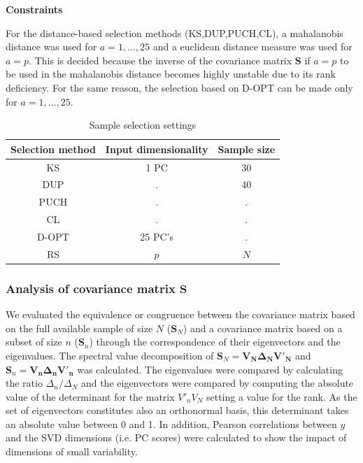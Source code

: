 \documentclass[journal=ancham,manuscript=article]{achemso}
\begin{document}
\textbf{Constraints}

For the distance-based selection methods (KS,DUP,PUCH,CL), a mahalanobis distance was used for $a=1,...,25$ and a euclidean distance measure was used for $a=p$. This is decided because the inverse of the covariance matrix $\mathbf{S}$ if $a=p$ to be used in the mahalanobis distance becomes highly unstable due to its rank deficiency. For the same reason, the selection based on D-OPT can be made only for $a=1,...,25$. 

\begin{table}[t]
\centering
\begin{tabular}{|c|c|c|} 
\hline
Selection method	& Input dimensionality	& Sample size	\\
\hline

KS & 1 PC   & 30  \\
DUP &  . & 40\\
PUCH &  . & . \\
CL & . & . \\
D-OPT & 25 PC's & .\\
RS & $p$ & $N$\\
\hline


\end{tabular}
\caption{Sample selection settings}
\label{tab_samplesel_settings_exhaustive_search}
\end{table}

\subsubsection*{Analysis of covariance matrix $\mathbf{S}$}

We evaluated the equivalence or congruence between the covariance matrix based on the full available sample of size $N$ ($\mathbf{S}_N$) and a covariance matrix based on a subset of size $n$ ($\mathbf{S}_n$) through the correspondence of their eigenvectors and the eigenvalues. The spectral value decomposition of $\mathbf{S}_N = \mathbf{V_N \Delta_N V'_N}$ and $\mathbf{S}_n = \mathbf{V_n \Delta_n V'_n}$ was calculated. The eigenvalues were compared by calculating the ratio  $\Delta_n/\Delta_N$ and the eigenvectors were compared by computing the absolute value of the determinant for the matrix $V'_nV_N$ setting a value for the rank. As the set of eigenvectors constitutes also an orthonormal basis, this determinant takes an absolute value between 0 and 1. In addition, Pearson correlations between $y$ and the SVD dimensions (i.e. PC scores) were calculated to show the impact of dimensions of small variability.
\end{document}
